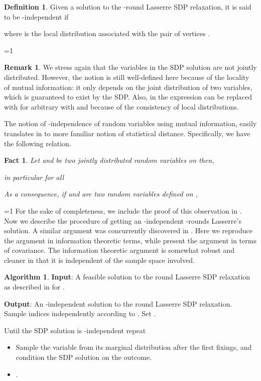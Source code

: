 \documentclass[11pt]{article}
\def\full{1}
\newtheorem{fact}[theorem]{Fact}
\theoremstyle{definition}
\newtheorem{definition}[theorem]{Definition}
\newtheorem{algorithm}[theorem]{Algorithm}
\newtheorem{remark}[theorem]{Remark}
\newenvironment{mybox}
{\center \noindent\begin{boxedminipage}{1.0\linewidth}}
{\end{boxedminipage}
\noindent
}
\numberwithin{equation}{section}
\let\pref=\prettyref
\begin{document}
\begin{definition} \label{def:alphaindependentsol}
Given a solution to the -round Lasserre SDP relaxation, it is said
to be -independent if

where  is the local distribution associated with the
pair of vertices .
\end{definition}
\ifnum\full=1
\begin{remark}
We stress again that the variables in the SDP solution are not jointly distributed. However, the notion is still well-defined here because of the locality of mutual information: it only depends on the joint distribution of two variables, which is guaranteed to exist by the SDP. Also,  in the expression can be replaced with  for arbitrary  with  and  because of the consistency of local distributions.
\end{remark}
\fi

The notion of -independence of random variables using mutual
information, easily translates in to more familiar notion of
statistical distance.  Specifically, we have the following relation.
\begin{fact} \label{fact:statdist}
Let  and  be two jointly distributed random variables on 
then,

in particular for all 

As a consequence, if  and  are two random variables defined on ,

\end{fact}
\ifnum\full=1
For the sake of completeness, we include the proof of this observation
in \pref{app:informationtheory}.
\fi
Now we describe the procedure of getting an -independent
-rounds Lasserre's solution.  A similar argument was concurrently discovered in \cite{BarakRS11}.
Here we reproduce the argument in information theoretic terms, while
\cite{BarakRS11} present the argument in terms of covariance.  The
information theoretic argument is somewhat robust and cleaner in that it is
independent of the sample space involved.

\begin{mybox}
\begin{algorithm}

{\bf Input}: A feasible solution to the  round Lasserre SDP
relaxation as described in \pref{sec:prelim} for .

{\bf Output}: An -independent solution to the  round Lasserre SDP
relaxation.\\

Sample indices  independently according to .  Set .

Until the SDP solution is -independent repeat
\begin{itemize}\itemsep=0ex
	\item	Sample the variable  from its marginal distribution after the
	first  fixings, and condition the SDP solution on the outcome.
\item .
\end{itemize}
\end{algorithm}
\end{mybox}
\end{document}
